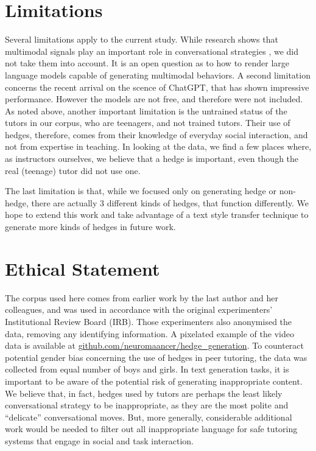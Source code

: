 \documentclass[11pt]{article}
\begin{document}
\section*{Limitations}

Several limitations apply to the current study. While research shows that multimodal signals play an important role in conversational strategies \citep{zhao2016a}, we did not take them into account. It is an open question as to how to render large language models capable of generating multimodal behaviors. A second limitation concerns the recent arrival on the scence of ChatGPT, that has shown impressive performance. However the models are not free, and therefore were not included. As noted above, another important limitation is the untrained status of the tutors in our corpus, who are teenagers, and not trained tutors. Their use of hedges, therefore, comes from their knowledge of everyday social interaction, and not from expertise in teaching. In looking at the data, we find a few places where, as instructors ourselves, we believe that a hedge is important, even though the real (teenage) tutor did not use one. %

The last limitation is that, while we focused only on generating hedge or non-hedge, there are actually  3 different kinds of hedges, that function differently. We hope to extend this work and take advantage of a text style transfer technique to generate more kinds of hedges in future work.  

\section*{Ethical Statement}
The corpus used here comes from earlier work by the last author and her colleagues, and was used in accordance with the original experimenters' Institutional Review Board (IRB). Those experimenters also anonymised the data, removing any identifying information. A pixelated example of the video data is available at \url{github.com/neuromaancer/hedge_generation}. To counteract potential gender bias concerning the use of hedges in peer tutoring, the data was collected from equal number of boys and girls. In text generation tasks, it is important to be aware of the potential risk of generating inappropriate content. We believe that, in fact, hedges used by tutors are perhaps the least likely conversational strategy to be inappropriate, as they are the most polite and ``delicate'' conversational moves. But, more generally, considerable additional work would be needed to filter out all inappropriate language for safe tutoring systems that engage in social and task interaction. 
\end{document}
